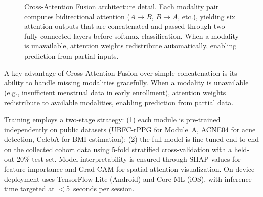 \documentclass[conference]{IEEEtran}
\begin{document}
\begin{figure}[t]
\caption{Cross-Attention Fusion architecture detail.
Each modality pair computes bidirectional attention ($A{\to}B$, $B{\to}A$, etc.),
yielding six attention outputs that are concatenated and passed through two
fully connected layers before softmax classification.
When a modality is unavailable, attention weights redistribute automatically,
enabling prediction from partial inputs.}
\label{fig:fusion}
\end{figure}

A key advantage of Cross-Attention Fusion over simple concatenation is its ability to handle missing modalities gracefully. When a modality is unavailable (e.g., insufficient menstrual data in early enrollment), attention weights redistribute to available modalities, enabling prediction from partial data.

Training employs a two-stage strategy: (1) each module is pre-trained independently on public datasets (UBFC-rPPG for Module~A, ACNE04 for acne detection, CelebA for BMI estimation); (2) the full model is fine-tuned end-to-end on the collected cohort data using 5-fold stratified cross-validation with a held-out 20\% test set. Model interpretability is ensured through SHAP values for feature importance and Grad-CAM for spatial attention visualization. On-device deployment uses TensorFlow Lite (Android) and Core ML (iOS), with inference time targeted at $<$5~seconds per session.
\end{document}
